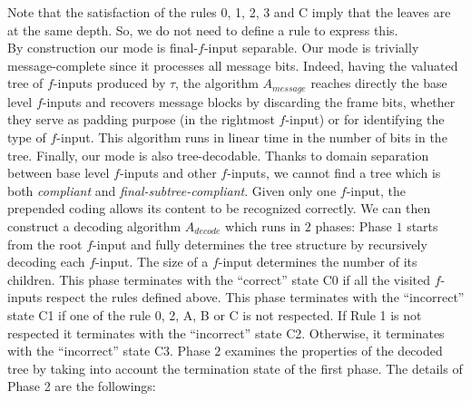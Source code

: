 \documentclass{llncs}
\begin{document}
\noindent
Note that the satisfaction of the rules 0, 1, 2, 3 and C imply that the leaves are at the same depth. So, we do not need to define a rule to express this.~\\

By construction our mode
is final-$f$-input separable. Our mode is trivially message-complete since it processes all message bits. Indeed, 
having the valuated tree of $f$-inputs produced by $\tau$, the algorithm $A_{message}$ reaches directly the base level $f$-inputs and recovers 
message blocks by discarding the frame bits, whether they serve as padding purpose (in the rightmost $f$-input) or for identifying the type of $f$-input.  
This algorithm runs in linear time in the number of bits in the tree.
Finally, our mode is also tree-decodable. Thanks to domain separation between base level $f$-inputs and other $f$-inputs, 
we cannot find a tree 
which is both \emph{compliant} and \emph{final-subtree-compliant}.
Given only one $f$-input, the prepended coding allows its content to be recognized correctly. We can then construct a decoding algorithm $A_{decode}$ which runs 
in $2$ phases: 
Phase $1$ starts from the root $f$-input and fully determines the tree structure by recursively decoding each $f$-input. The size of a $f$-input determines the 
number of its children. This phase terminates with the ``correct'' state C0 if all the visited $f$-inputs respect the rules defined above.
This phase terminates with the ``incorrect'' state C1 if one of the rule 0, 2, A, B or C is not respected. 
If Rule 1 is not respected it terminates with the ``incorrect'' state C2. Otherwise, it terminates with the ``incorrect'' state C3.
Phase $2$ examines the properties of 
the decoded tree by taking into account the termination state of the first phase. The details of Phase 2 are the followings:
\end{document}
